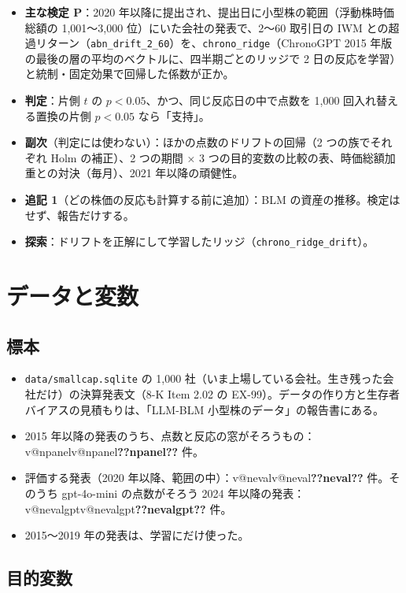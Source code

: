 \documentclass[xelatex,ja=standard,jafont=haranoaji,a4paper,10pt,openany]{bxjsreport}
\makeatletter
\newcommand{\V}[1]{\ifcsname v@#1\endcsname\csname v@#1\endcsname\else\textbf{??#1??}\fi}
\newcommand{\code}[1]{\texttt{#1}}
\makeatother
\begin{document}
\begin{itemize}
\item \textbf{主な検定 P}：2020 年以降に提出され、提出日に小型株の範囲（浮動株時価総額の 1,001〜3,000 位）にいた会社の発表で、2〜60 取引日の IWM との超過リターン（\code{abn\_drift\_2\_60}）を、\code{chrono\_ridge}（ChronoGPT 2015 年版の最後の層の平均のベクトルに、四半期ごとのリッジで 2 日の反応を学習）と統制・固定効果で回帰した係数が正か。
\item \textbf{判定}：片側 $t$ の $p < 0.05$、かつ、同じ反応日の中で点数を 1,000 回入れ替える置換の片側 $p < 0.05$ なら「支持」。
\item \textbf{副次}（判定には使わない）：ほかの点数のドリフトの回帰（2 つの族でそれぞれ Holm の補正）、2 つの期間 × 3 つの目的変数の比較の表、時価総額加重との対決（毎月）、2021 年以降の頑健性。
\item \textbf{追記 1}（どの株価の反応も計算する前に追加）：BLM の資産の推移。検定はせず、報告だけする。
\item \textbf{探索}：ドリフトを正解にして学習したリッジ（\code{chrono\_ridge\_drift}）。
\end{itemize}

\chapter{データと変数}\label{ch:data}

\section{標本}

\begin{itemize}
\item \code{data/smallcap.sqlite} の 1,000 社（いま上場している会社。生き残った会社だけ）の決算発表文（8-K Item 2.02 の EX-99）。データの作り方と生存者バイアスの見積もりは、「LLM-BLM 小型株のデータ」の報告書にある。
\item 2015 年以降の発表のうち、点数と反応の窓がそろうもの：\V{npanel} 件。
\item 評価する発表（2020 年以降、範囲の中）：\V{neval} 件。そのうち gpt-4o-mini の点数がそろう 2024 年以降の発表：\V{nevalgpt} 件。
\item 2015〜2019 年の発表は、学習にだけ使った。
\end{itemize}

\section{目的変数}
\end{document}
